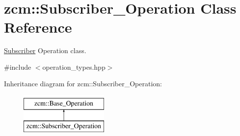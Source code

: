 \hypertarget{classzcm_1_1Subscriber__Operation}{}\section{zcm\+:\+:Subscriber\+\_\+\+Operation Class Reference}
\label{classzcm_1_1Subscriber__Operation}


\hyperlink{classzcm_1_1Subscriber}{Subscriber} Operation class.  




{\ttfamily \#include $<$operation\+\_\+types.\+hpp$>$}

Inheritance diagram for zcm\+:\+:Subscriber\+\_\+\+Operation\+:\begin{figure}[H]
\begin{center}
\leavevmode
\includegraphics[height=2.000000cm]{classzcm_1_1Subscriber__Operation}
\end{center}
\end{figure}

